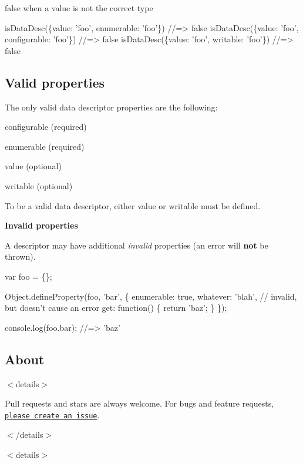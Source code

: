 {\ttfamily false} when a value is not the correct type


\begin{DoxyCode}
isDataDesc(\{value: 'foo', enumerable: 'foo'\})
//=> false
isDataDesc(\{value: 'foo', configurable: 'foo'\})
//=> false
isDataDesc(\{value: 'foo', writable: 'foo'\})
//=> false
\end{DoxyCode}


\subsection*{Valid properties}

The only valid data descriptor properties are the following\+:


\begin{DoxyItemize}
\item {\ttfamily configurable} (required)
\item {\ttfamily enumerable} (required)
\item {\ttfamily value} (optional)
\item {\ttfamily writable} (optional)
\end{DoxyItemize}

To be a valid data descriptor, either {\ttfamily value} or {\ttfamily writable} must be defined.

{\bfseries Invalid properties}

A descriptor may have additional {\itshape invalid} properties (an error will {\bfseries not} be thrown).


\begin{DoxyCode}
var foo = \{\};

Object.defineProperty(foo, 'bar', \{
  enumerable: true,
  whatever: 'blah', // invalid, but doesn't cause an error
  get: function() \{
    return 'baz';
  \}
\});

console.log(foo.bar);
//=> 'baz'
\end{DoxyCode}


\subsection*{About}

$<$details$>$

Pull requests and stars are always welcome. For bugs and feature requests, \href{../../issues/new}{\tt please create an issue}.

$<$/details$>$

$<$details$>$ 

